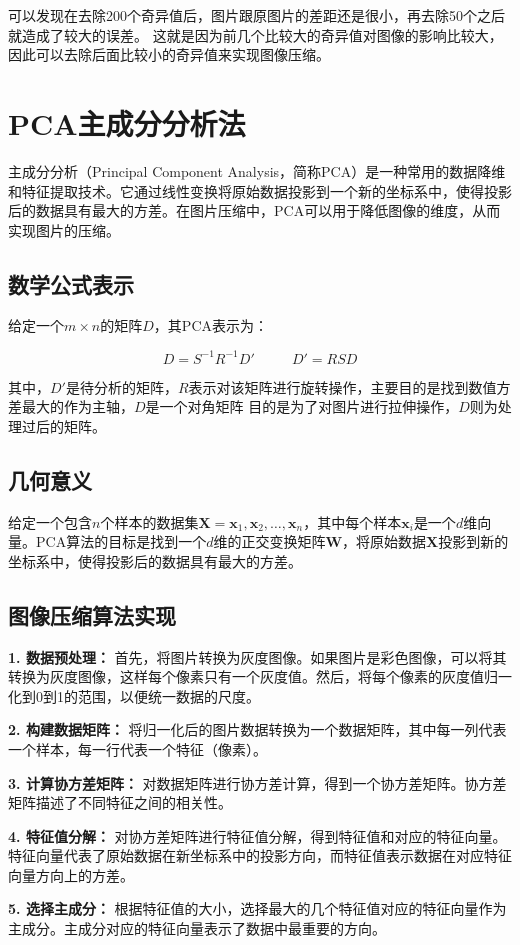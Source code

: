 \documentclass[UTF8]{ctexart}
\begin{document}
  
  可以发现在去除200个奇异值后，图片跟原图片的差距还是很小，再去除50个之后就造成了较大的误差。
  这就是因为前几个比较大的奇异值对图像的影响比较大，因此可以去除后面比较小的奇异值来实现图像压缩。
\section{PCA主成分分析法}
主成分分析（Principal Component Analysis，简称PCA）是一种常用的数据降维和特征提取技术。它通过线性变换将原始数据投影到一个新的坐标系中，使得投影后的数据具有最大的方差。在图片压缩中，PCA可以用于降低图像的维度，从而实现图片的压缩。
\subsection{数学公式表示}
给定一个$m \times n$的矩阵$D$，其PCA表示为：

\[
D=S^{-1}R^{-1}D'~~~~~~~~~~~~D'= RSD
\]

其中，$D'$是待分析的矩阵，$R$表示对该矩阵进行旋转操作，主要目的是找到数值方差最大的作为主轴，$D$是一个对角矩阵
目的是为了对图片进行拉伸操作，$D$则为处理过后的矩阵。
\subsection{几何意义}
给定一个包含$n$个样本的数据集$\mathbf{X}={\mathbf{x}_1, \mathbf{x}_2, \ldots, \mathbf{x}_n}$，其中每个样本$\mathbf{x}_i$是一个$d$维向量。PCA算法的目标是找到一个$d$维的正交变换矩阵$\mathbf{W}$，将原始数据$\mathbf{X}$投影到新的坐标系中，使得投影后的数据具有最大的方差。
\subsection{图像压缩算法实现}
\textbf{1. 数据预处理：} 首先，将图片转换为灰度图像。如果图片是彩色图像，可以将其转换为灰度图像，这样每个像素只有一个灰度值。然后，将每个像素的灰度值归一化到0到1的范围，以便统一数据的尺度。

\textbf{2. 构建数据矩阵：} 将归一化后的图片数据转换为一个数据矩阵，其中每一列代表一个样本，每一行代表一个特征（像素）。

\textbf{3. 计算协方差矩阵：} 对数据矩阵进行协方差计算，得到一个协方差矩阵。协方差矩阵描述了不同特征之间的相关性。

\textbf{4. 特征值分解：} 对协方差矩阵进行特征值分解，得到特征值和对应的特征向量。特征向量代表了原始数据在新坐标系中的投影方向，而特征值表示数据在对应特征向量方向上的方差。

\textbf{5. 选择主成分：} 根据特征值的大小，选择最大的几个特征值对应的特征向量作为主成分。主成分对应的特征向量表示了数据中最重要的方向。
\end{document}

